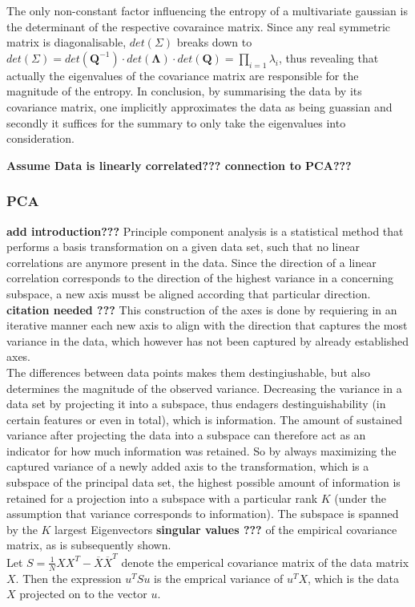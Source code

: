 \documentclass[a4paper, 11pt]{article}
\begin{document}
The only non-constant factor influencing the entropy of a multivariate gaussian is the determinant of the respective covaraince matrix.
Since any real symmetric matrix is diagonalisable, $det(\Sigma)$ breaks down to $det(\Sigma) = det(\mathbf{Q}^{-1}) \cdot det(\mathbf{\Lambda})\cdot det(\mathbf{Q}) = \prod_{i = 1} \lambda_{i}$, thus revealing that actually the eigenvalues of the covariance matrix are responsible for the magnitude of the entropy. In conclusion, by summarising the data by its covariance matrix, one implicitly approximates the data as being guassian and secondly it suffices for the summary to only take the eigenvalues into consideration.

\textbf{Assume Data is linearly correlated??? connection to PCA???}

\subsubsection{PCA}

\textbf{add introduction???}
Principle component analysis is a statistical method that performs a basis transformation on a given data set, such that no linear correlations are anymore present in the data. Since the direction of a linear correlation corresponds to the direction of the highest variance in a concerning subspace, a new axis musst be aligned according that particular direction. \textbf{citation needed ???} This construction of the axes is done by requiering in an iterative manner each new axis to align with the direction that captures the most variance in the data, which however has not been captured by already established axes. \\
The differences between data points makes them destingiushable, but also determines the magnitude of the observed variance. Decreasing the variance in a data set by projecting it into a subspace, thus endagers destinguishability (in certain features or even in total), which is information. The amount of sustained variance after projecting the data into a subspace can therefore act as an indicator for how much information was retained. So by always maximizing the captured variance of a newly added axis to the transformation, which is a subspace of the principal data set, the highest possible amount of information is retained for a projection into a subspace with a particular rank $K$ (under the assumption that variance corresponds to information). The subspace is spanned by the $K$ largest Eigenvectors \textbf{singular values ???} of the empirical covariance matrix, as is subsequently shown. \\
Let $S = \frac{1}{N}XX^T - \overline{X} \overline{X}^T$ denote the emperical covariance matrix of the data matrix $X$. Then the expression $u^TSu$ is the emprical variance of $u^TX$, which is the data $X$ projected on to the vector $u$.
\end{document}
